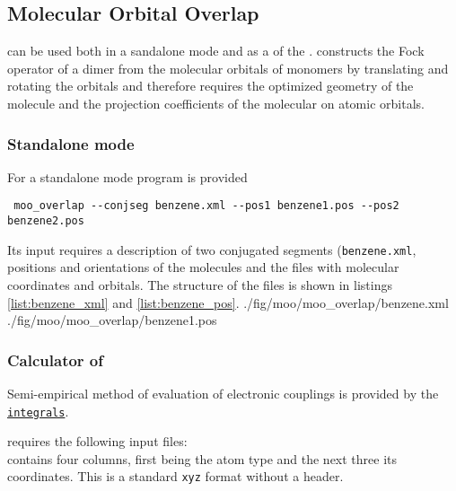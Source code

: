 \newcommand{\integrals}{\hyperref[calc:integrals]{\texttt{integrals}}\xspace}

\subsection{Molecular Orbital Overlap}

\moo can be used both in a sandalone mode and as a \calculator of the \votcact. \moo constructs the Fock operator of a dimer from the  molecular orbitals of monomers by translating and rotating the orbitals and therefore requires the optimized geometry of the molecule and the projection coefficients of the molecular on atomic orbitals. 


\subsubsection{Standalone mode}
For a standalone mode program \overlap is provided 
\begin{verbatim}
 moo_overlap --conjseg benzene.xml --pos1 benzene1.pos --pos2 benzene2.pos
\end{verbatim}
Its input requires a description of two conjugated segments (\texttt{benzene.xml}, positions and orientations of the molecules and the files with molecular coordinates and orbitals. The structure of the files is shown in listings \ref{list:benzene_xml} and  \ref{list:benzene_pos}.
\vskip 0.1cm
 {./fig/moo/moo_overlap/benzene.xml}
\vskip 0.1cm
 {./fig/moo/moo_overlap/benzene1.pos}


\subsubsection{Calculator of \votcact}
Semi-empirical method of evaluation of electronic couplings is provided by the \integrals \calculator.


\moo requires the following input files: \\
\noindent
\xyz contains four columns, first being the atom type and the next three its coordinates. This is a standard \texttt{xyz} format without a header. 
\vskip 0.1cm
\noindent


